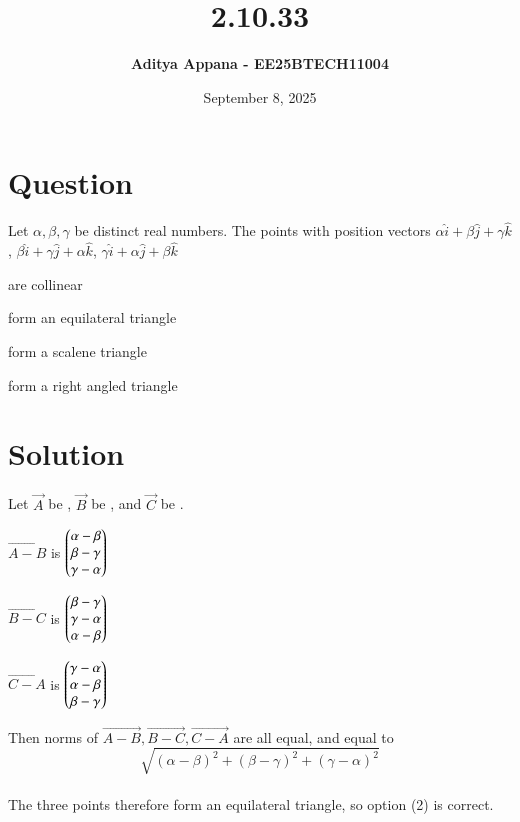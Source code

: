 \documentclass[12pt]{article}
\title{\textbf{2.10.33}}
\author{\textbf{Aditya Appana - EE25BTECH11004 }}
\date{September 8, 2025}
\begin{document}
\maketitle

\section*{Question}

Let $\alpha , \beta, \gamma$ be distinct real numbers. The points with position vectors $\alpha\hat{i} + \beta\hat{j} + \gamma\hat{k}$, $\beta\hat{i} +\gamma\hat{j} + \alpha\hat{k}$, $\gamma\hat{i} + \alpha\hat{j} + \beta\hat{k}$

\begin{enumerate}\begin{multicols}{2}
    \item are collinear
    \item form an equilateral triangle
    \item form a scalene triangle
    \item form a right angled triangle
    \end{multicols}
\end{enumerate}

\section*{Solution}

Let $\vec{A}$ be \myvec{\alpha \\ \beta \\ \gamma}, $\vec{B}$ be \myvec{ \beta \\ \gamma \\ \alpha}, and $\vec{C}$ be \myvec{\gamma \\ \alpha \\ \beta}. \\



\begin{itemize} \begin{multicols}{3}
    \item $\vec{A-B}$ is $\begin{pmatrix}\alpha - \beta \\ \beta - \gamma \\ \gamma - \alpha\end{pmatrix}$
    \item $\vec{B-C}$ is $\begin{pmatrix}\beta - \gamma \\ \gamma - \alpha \\ \alpha - \beta\end{pmatrix}$
    \item $\vec{C-A}$ is $\begin{pmatrix}\gamma - \alpha \\ \alpha - \beta \\ \beta - \gamma\end{pmatrix}$
    \end{multicols}
\end{itemize}

Then norms of $\vec{A-B}, \vec{B-C}, \vec{C-A}$ are all equal, and equal to 
$$\sqrt{(\alpha - \beta)^2  + (\beta - \gamma)^2 + (\gamma - \alpha)^2}$$\\

The three points therefore form an equilateral triangle, so option (2) is correct.
\end{document}
